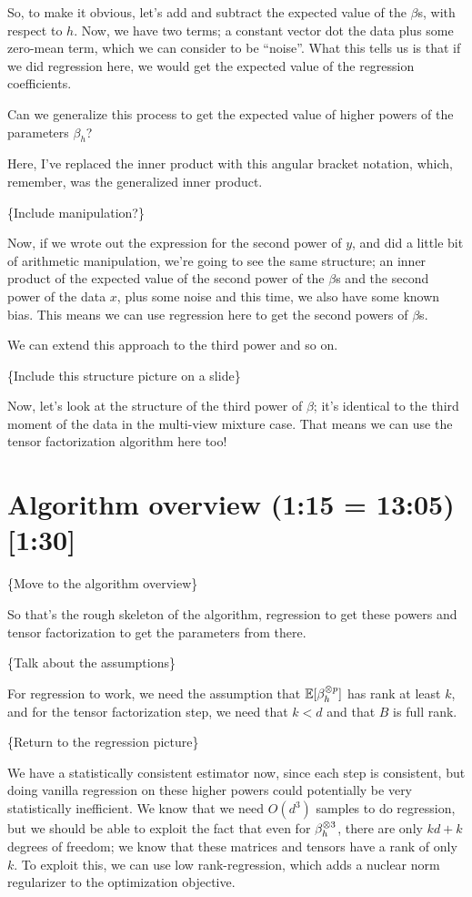 \documentclass[tablecaption=bottom]{jmlr}
\begin{document}
So, to make it obvious, let's add and subtract the expected value of the
$\beta$s, with respect to $h$. Now, we have two terms; a constant vector
dot the data plus some zero-mean term, which we can consider to be
``noise''. What this tells us is that if we did regression here, we
would get the expected value of the regression coefficients.

Can we generalize this process to get the expected value of higher
powers of the parameters $\beta_h$?

Here, I've replaced the inner product with this angular bracket
notation, which, remember, was the generalized inner product.

\{Include manipulation?\}

Now, if we wrote out the expression for the second power of $y$, and did
a little bit of arithmetic manipulation, we're going to see the same
structure; an inner product of the expected value of the second power of
the $\beta$s and the second power of the data $x$, plus some noise and
this time, we also have some known bias. This means we can use
regression here to get the second powers of $\beta$s.

We can extend this approach to the third power and so on.

\{Include this structure picture on a slide\}

Now, let's look at the structure of the third power of $\beta$; it's
identical to the third moment of the data in the multi-view mixture
case. That means we can use the tensor factorization algorithm here too!

\section{Algorithm overview (1:15 = 13:05) {[}1:30{]}}

\{Move to the algorithm overview\}

So that's the rough skeleton of the algorithm, regression to get these
powers and tensor factorization to get the parameters from there.

\{Talk about the assumptions\}

For regression to work, we need the assumption that $\operatorname{\mathbb{E}}[\beta_h^{\otimes p}]$
has rank at least $k$, and for the tensor factorization step, we need
that $k < d$ and that $B$ is full rank.

\{Return to the regression picture\}

We have a statistically consistent estimator now, since each step is
consistent, but doing vanilla regression on these higher powers could
potentially be very statistically inefficient. We know that we need
$O(d^3)$ samples to do regression, but we should be able to exploit the
fact that even for $\beta_h^{\otimes3}$, there are only $kd + k$ degrees of
freedom; we know that these matrices and tensors have a rank of only
$k$. To exploit this, we can use low rank-regression, which adds a
nuclear norm regularizer to the optimization objective.
\end{document}
